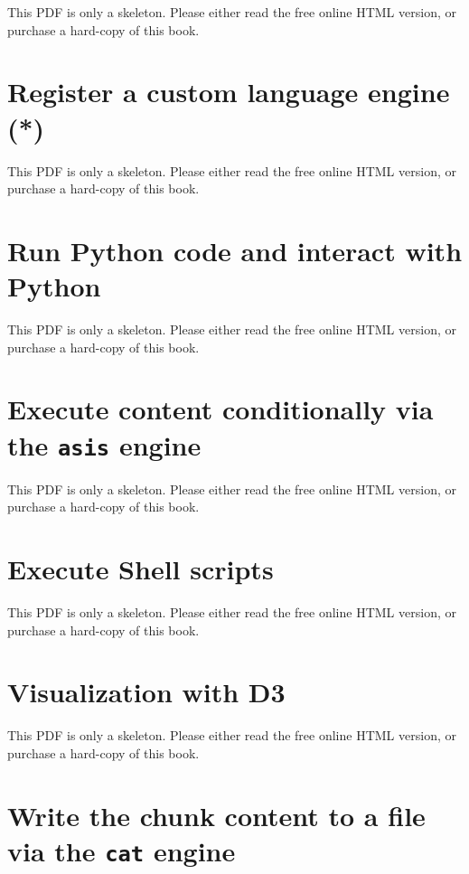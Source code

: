 \documentclass[
  11pt,
]{krantz}
\begin{document}
This PDF is only a skeleton. Please either read the free online HTML version, or purchase a hard-copy of this book.

\section{Register a custom language engine (*)}\label{custom-engine}

This PDF is only a skeleton. Please either read the free online HTML version, or purchase a hard-copy of this book.

\section{Run Python code and interact with Python}\label{eng-python}

This PDF is only a skeleton. Please either read the free online HTML version, or purchase a hard-copy of this book.

\section{\texorpdfstring{Execute content conditionally via the \texttt{asis} engine}{Execute content conditionally via the asis engine}}\label{eng-asis}

This PDF is only a skeleton. Please either read the free online HTML version, or purchase a hard-copy of this book.

\section{Execute Shell scripts}\label{eng-bash}

This PDF is only a skeleton. Please either read the free online HTML version, or purchase a hard-copy of this book.

\section{Visualization with D3}\label{d3}

This PDF is only a skeleton. Please either read the free online HTML version, or purchase a hard-copy of this book.

\section{\texorpdfstring{Write the chunk content to a file via the \texttt{cat} engine}{Write the chunk content to a file via the cat engine}}\label{eng-cat}
\end{document}

